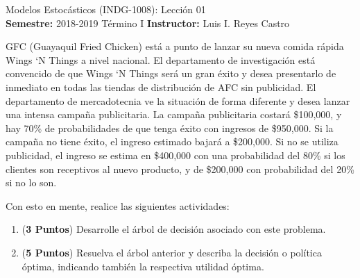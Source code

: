 \documentclass[ a4paper, twoside, 11pt]{article}
\newcommand{\numero}{01}
\begin{document}
\allowdisplaybreaks



\begin{center}
\Large Modelos Estoc\'asticos (INDG-1008): Lecci\'on \numero \\[2ex]
\small \textbf{Semestre:} 2018-2019 T\'ermino I \qquad
\textbf{Instructor:} Luis I. Reyes Castro
\end{center}
\fullskip

\begin{problem}
GFC (Guayaquil Fried Chicken) est\'a a punto de lanzar su nueva comida r\'apida Wings ‘N Things a nivel nacional. El departamento de investigaci\'on est\'a convencido de que Wings ‘N Things ser\'a un gran \'exito y desea presentarlo de inmediato en todas las tiendas de distribuci\'on de AFC sin publicidad. El departamento de mercadotecnia ve la situaci\'on de forma diferente y desea lanzar una intensa campa\~na publicitaria. La campa\~na publicitaria costar\'a \$100,000, y hay 70\% de probabilidades de que tenga \'exito con ingresos de \$950,000. Si la campaña no tiene éxito, el ingreso estimado bajar\'a a \$200,000. Si no se utiliza publicidad, el ingreso se estima en \$400,000 con una probabilidad del 80\% si los clientes son receptivos al nuevo producto, y de \$200,000 con probabilidad del 20\% si no lo son. 

Con esto en mente, realice las siguientes actividades: 
\begin{enumerate}[label=\alph*)]
\item (\textbf{3 Puntos}) Desarrolle el \'arbol de decisi\'on asociado con este problema. 
\item (\textbf{5 Puntos}) Resuelva el \'arbol anterior y describa la decisi\'on o pol\'itica \'optima, indicando tambi\'en la respectiva utilidad \'optima. 
\end{enumerate}

\end{problem}
\vspace{\baselineskip}
\end{document}
